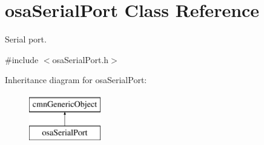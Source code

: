 \hypertarget{classosa_serial_port}{}\section{osa\+Serial\+Port Class Reference}
\label{classosa_serial_port}


Serial port.  




{\ttfamily \#include $<$osa\+Serial\+Port.\+h$>$}

Inheritance diagram for osa\+Serial\+Port\+:\begin{figure}[H]
\begin{center}
\leavevmode
\includegraphics[height=2.000000cm]{d3/d6d/classosa_serial_port}
\end{center}
\end{figure}

